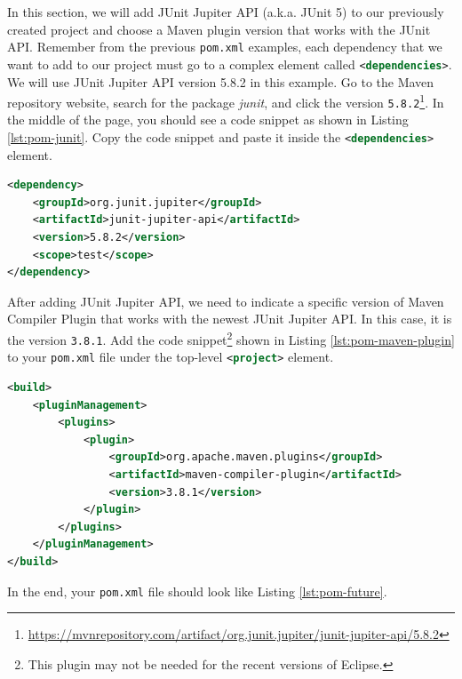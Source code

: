 In this section, we will add JUnit Jupiter API (a.k.a. JUnit 5) to our previously created project and choose a Maven plugin version that works with the JUnit API. Remember from the previous \verb|pom.xml| examples, each dependency that we want to add to our project must go to a complex element called \lstinline[language=XML]|<dependencies>|. We will use JUnit Jupiter API version 5.8.2 in this example. Go to the Maven repository website, search for the package \emph{junit}, and click the version \lstinline[language={}]|5.8.2|\footnote{\url{https://mvnrepository.com/artifact/org.junit.jupiter/junit-jupiter-api/5.8.2}}. In the middle of the page, you should see a code snippet as shown in Listing \ref{lst:pom-junit}. Copy the code snippet and paste it inside the \lstinline[language=XML]|<dependencies>| element.

\begin{lstlisting}[language=XML,caption={JUnit Jupiter API version 5.8.2 dependency element.},label=lst:pom-junit]
<dependency>
    <groupId>org.junit.jupiter</groupId>
    <artifactId>junit-jupiter-api</artifactId>
    <version>5.8.2</version>
    <scope>test</scope>
</dependency>
\end{lstlisting}

After adding JUnit Jupiter API, we need to indicate a specific version of Maven Compiler Plugin that works with the newest JUnit Jupiter API. In this case, it is the version \lstinline[language={}]|3.8.1|. Add the code snippet\footnote{This plugin may not be needed for the recent versions of Eclipse.} shown in Listing \ref{lst:pom-maven-plugin} to your \lstinline[language={}]|pom.xml| file under the top-level \lstinline[language=XML]|<project>| element.

\begin{lstlisting}[language=XML,caption={A compatible Maven Compiler Plugin JUnit Jupiter API v5.8.2..},label=lst:pom-maven-plugin]
<build>
    <pluginManagement>
        <plugins>
            <plugin>
                <groupId>org.apache.maven.plugins</groupId>
                <artifactId>maven-compiler-plugin</artifactId>
                <version>3.8.1</version>
            </plugin>
        </plugins>
    </pluginManagement>
</build>
\end{lstlisting}

In the end, your \verb|pom.xml| file should look like Listing \ref{lst:pom-future}.

